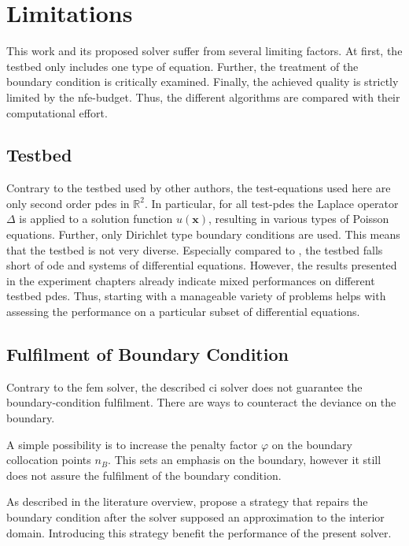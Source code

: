 \documentclass[./\jobname.tex]{subfiles}
\begin{document}
\section{Limitations}
This work and its proposed solver suffer from several limiting factors. At first, the testbed only includes one type of equation. Further, the treatment of the boundary condition is critically examined. Finally, the achieved quality is strictly limited by the \gls{nfe}-budget. Thus, the different algorithms are compared with their computational effort. 

\subsection{Testbed}

Contrary to the testbed used by other authors, the test-equations used here are only second order \gls{pde}s in $\mathbb{R}^2$. In particular, for all test-\gls{pde}s the Laplace operator $\Delta$ is applied to a solution function $u(\mathbf{x})$, resulting in various types of Poisson equations. Further, only Dirichlet type boundary conditions are used. This means that the testbed is not very diverse. Especially compared to \cite{chaquet_using_2019}, the testbed falls short of \gls{ode} and systems of differential equations. However, the results presented in the experiment chapters already indicate mixed performances on different testbed \gls{pde}s. Thus, starting with a manageable variety of problems helps with assessing the performance on a particular subset of differential equations.  


\subsection{Fulfilment of Boundary Condition}
Contrary to the \gls{fem} solver, the described \gls{ci} solver does not guarantee the boundary-condition fulfilment. There are ways to counteract the deviance on the boundary. 

A simple possibility is to increase the penalty factor $\varphi$ on the boundary collocation points $n_B$. This sets an emphasis on the boundary, however it still does not assure the fulfilment of the boundary condition.

As described in the literature overview, \cite{kirstukas_hybrid_2005} propose a strategy that repairs the boundary condition after the solver supposed an approximation to the interior domain. Introducing this strategy benefit the performance of the present solver. 
\end{document}
